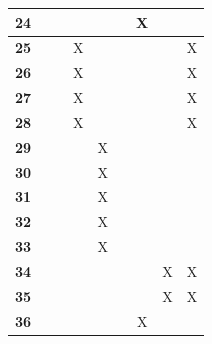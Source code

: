 \documentclass[12pt, titlepage]{article}
\begin{document}
\begin{table} [H]
\begin{tabular}{|c|c|c|c|c|c|c|c|c|}
\textbf{24} &                     &                     &                     &                     &                   &       X           &                       & \\ \hline
\textbf{25} &                     &                     &        X             &                     &                   &                  &                       &X\\ \hline
\textbf{26} &                     &                     &     X                &                     &                   &                  &                       &X \\ \hline
\textbf{27} &                     &                     &     X                &                     &                   &                  &                       &X \\ \hline
\textbf{28} &                     &                     &     X                &                     &                   &                  &                       &X \\ \hline
\textbf{29} &                     &                     &                     & X                    &                   &                  &                       & \\ \hline
\textbf{30} &                     &                     &                     & X                    &                   &                  &                       & \\ \hline
\textbf{31} &                     &                     &                     & X                    &                   &                  &                       & \\ \hline
\textbf{32} &                     &                     &                     & X                    &                   &                  &                       & \\ \hline
\textbf{33} &                     &                     &                     & X                    &                   &                  &                       & \\ \hline
\textbf{34} &                     &                     &                     &                     &                   &                  & X                      & X\\ \hline
\textbf{35} &                     &                     &                     &                     &                   &                  &X                       &X \\ \hline
\textbf{36} &                     &                     &                     &                     &                   &X                  &                       & \\ \hline

\end{tabular}
\end{table}
\end{document}
